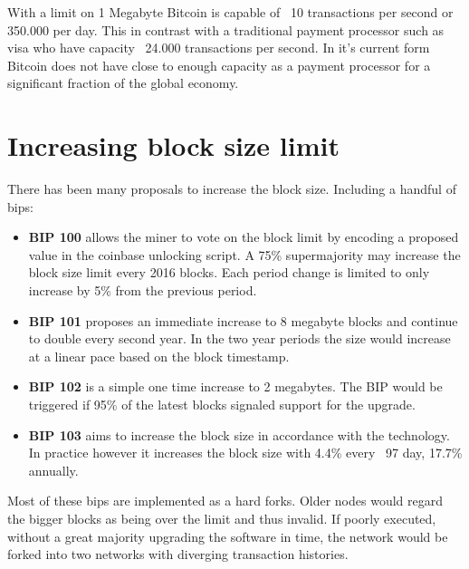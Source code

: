 
With a limit on 1 Megabyte Bitcoin is capable of ~10 transactions per second or 350.000 per day. This in contrast with a traditional payment processor such as visa who have capacity ~24.000 transactions per second. In it's current form Bitcoin does not have close to enough capacity as a payment processor for a significant fraction of the global economy.

\section{Increasing block size limit}

There has been many proposals to increase the block size. Including a handful of \gls{bip}s:

\begin{itemize}
	
	\item \textbf{BIP 100} allows the miner to vote on the block limit by encoding a proposed value in the coinbase unlocking script. A 75\% supermajority may increase the block size limit every 2016 blocks. Each period change is limited to only increase by 5\% from the previous period.~\cite{bip:0100:dynamic:block:size}
	
	\item \textbf{BIP 101} proposes an immediate increase to 8 megabyte blocks and continue to double every second year. In the two year periods the size would increase at a linear pace based on the block timestamp.~\cite{bip:0101:increase:block:size}
	
	\item \textbf{BIP 102} is a simple one time increase to 2 megabytes. The BIP would be triggered if 95\% of the latest blocks signaled support for the upgrade.~\cite{bip:0102:increase:2mb}
	
	\item \textbf{BIP 103} aims to increase the block size in accordance with the technology. In practice however it increases the block size with 4.4\% every ~97 day, 17.7\% annually.~\cite{bip:0103:increase:with:technology}
\end{itemize}

Most of these \gls{bip}s are implemented as a hard forks. Older nodes would regard the bigger blocks as being over the limit and thus invalid.
If poorly executed, without a great majority upgrading the software in time, the network would be forked into two networks with diverging transaction histories. 

